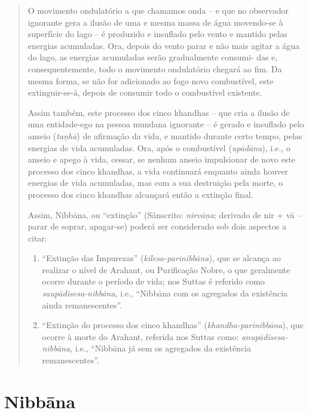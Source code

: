 \begin{quote}
  O movimento ondulatório a que chamamos onda -- e que no observador ignorante
  gera a ilusão de uma e mesma massa de água movendo-se à superfície do lago --
  é produzido e insuflado pelo vento e mantido pelas energias acumuladas. Ora,
  depois do vento parar e não mais agitar a água do lago, as energias acumuladas
  serão gradualmente consumi- das e, consequentemente, todo o movimento
  ondulatório chegará ao fim. Da mesma forma, se não for adicionado ao fogo novo
  combustível, este extinguir-se-á, depois de consumir todo o combustível
  existente.

  Assim também, este processo dos cinco khandhas -- que cria a ilusão de uma
  entidade-ego na pessoa mundana ignorante -- é gerado e insuflado pelo anseio
  (\emph{ta\d{n}hā}) de afirmação da vida, e mantido durante certo tempo, pelas energias de
  vida acumuladas. Ora, após o combustível (\emph{upādāna}), i.e., o anseio e
  apego à vida, cessar, se nenhum anseio impulsionar de novo este processo dos
  cinco khandhas, a vida continuará enquanto ainda houver energias de vida
  acumuladas, mas com a sua destruição pela morte, o processo dos cinco khandhas
  alcançará então a extinção final.

  Assim, Nibbāna, ou ``extinção'' (Sânscrito: \emph{nirvā\d{n}a}; derivado de nir +
  vā -- parar de soprar, apagar-se) poderá ser considerado sob dois aspectos a
  citar:

  \begin{enumerate}

    \item ``Extinção das Impurezas'' (\emph{kilesa-parinibbāna}), que se
          alcança ao realizar o nível de Arahant, ou Purificação Nobre, o que
          geralmente ocorre durante o período de vida; nos Suttas é referido
          como \emph{saupādisesa-nibbāna}, i.e., ``Nibbāna com os agregados da
          existência ainda remanescentes''.

    \item ``Extinção do processo dos cinco khandhas''
          (\emph{khandha-parinibbāna}), que ocorre à morte do Arahant, referida
          nos Suttas como: \emph{anupādisesa-nibbāna}, i.e., ``Nibbāna já sem os
          agregados da existência remanescentes''.

  \end{enumerate}
\end{quote}

\section{Nibbāna}

